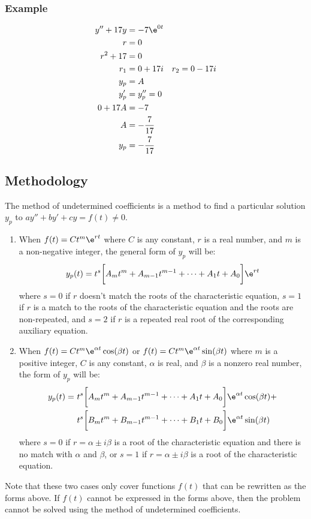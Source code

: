 \documentclass{math}
\begin{document}
\subsubsection*{Example}
\begin{align*}
  y''+17y &= -7\e^{0t} \\
  r &= 0 \\
  r^2+17 &= 0 \\
  r_1 &= 0+17i \quad r_2 = 0-17i \\
  y_p &= A \\
  y_p' &= y_p'' = 0 \\
  0+17A &= -7 \\
  A &= -\frac{7}{17} \\
  y_p &= -\frac{7}{17}
\end{align*}

\subsection*{Methodology}
The method of undetermined coefficients is a method to find a particular
solution \( y_p \) to \( ay''+by'+cy = f(t) \ne 0 \).
\begin{enumerate}
  \item When \( f(t) = Ct^m\e^{rt} \) where \( C \) is any constant, \( r \) is
  a real number, and \( m \) is a non-negative integer, the general form of
  \( y_p \) will be:
  \[ y_p(t) = t^s\bigg[A_mt^m+A_{m-1}t^{m-1}+\dots+A_1t+A_0\bigg]\e^{rt} \]
  where \( s = 0 \) if \( r \) doesn't match the roots of the characteristic
  equation, \( s = 1 \) if \( r \) is a match to the roots of the characteristic
  equation and the roots are non-repeated, and \( s = 2 \) if \( r \) is a
  repeated real root of the corresponding auxiliary equation.
  \item When \( f(t) = Ct^m\e^{\alpha t}\cos(\beta t) \) or \( f(t) =
  Ct^m\e^{\alpha t}\sin(\beta t) \) where \( m \) is a positive integer, \( C \)
  is any constant, \( \alpha \) is real, and \( \beta \) is a nonzero real
  number, the form of \( y_p \) will be:
  \begin{align*}
    y_p(t) =\ & t^s\bigg[A_mt^m+A_{m-1}t^{m-1}+\dots+A_1t+A_0\bigg]\e^{\alpha t}
      \cos(\beta t)+ \\
    & t^s\bigg[B_mt^m+B_{m-1}t^{m-1}+\dots+B_1t+B_0\bigg]\e^{\alpha t}
      \sin(\beta t)
  \end{align*}
  where \( s = 0 \) if \( r = \alpha\pm i\beta \) is a root of the
  characteristic equation and there is no match with \( \alpha \) and
  \( \beta \), or \( s = 1 \) if \( r = \alpha\pm i\beta \) is a root of the
  characteristic equation.
\end{enumerate}
Note that these two cases only cover functions \( f(t) \) that can be rewritten
as the forms above. If \( f(t) \) cannot be expressed in the forms above, then
the problem cannot be solved using the method of undetermined coefficients.
\end{document}
